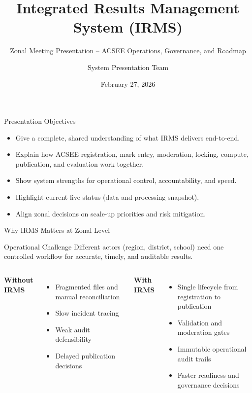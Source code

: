 \documentclass[aspectratio=169,11pt]{beamer}
\title{Integrated Results Management System (IRMS)}
\subtitle{Zonal Meeting Presentation -- ACSEE Operations, Governance, and Roadmap}
\author{System Presentation Team}
\institute{PMO-RALG | Examination Operations}
\date{February 27, 2026}
\begin{document}
\begin{frame}
  \titlepage
\end{frame}

\begin{frame}{Presentation Objectives}
\begin{itemize}
  \item Give a complete, shared understanding of what IRMS delivers end-to-end.
  \item Explain how ACSEE registration, mark entry, moderation, locking, compute, publication, and evaluation work together.
  \item Show system strengths for operational control, accountability, and speed.
  \item Highlight current live status (data and processing snapshot).
  \item Align zonal decisions on scale-up priorities and risk mitigation.
\end{itemize}
\end{frame}

\begin{frame}{Why IRMS Matters at Zonal Level}
\begin{block}{Operational Challenge}
Different actors (region, district, school) need one controlled workflow for accurate, timely, and auditable results.
\end{block}

\vspace{0.2cm}
\begin{columns}[T]
\textbf{Without IRMS}
\begin{itemize}
  \item Fragmented files and manual reconciliation
  \item Slow incident tracing
  \item Weak audit defensibility
  \item Delayed publication decisions
\end{itemize}

\textbf{With IRMS}
\begin{itemize}
  \item Single lifecycle from registration to publication
  \item Validation and moderation gates
  \item Immutable operational audit trails
  \item Faster readiness and governance decisions
\end{itemize}
\end{columns}
\end{frame}
\end{document}
